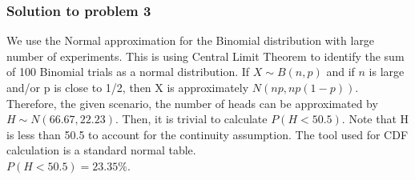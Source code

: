 \documentclass[12pt]{article}%
\begin{document}
\subsubsection{Solution to problem 3}

We use the Normal approximation for the Binomial distribution with large number of experiments. This is using Central Limit Theorem to identify the sum of 100 Binomial trials as a normal distribution. If $X \sim B(n, p)$ and if $n$ is large and/or p is close to 1/2, then X is approximately $N(np, np(1-p))$. Therefore, the given scenario, the number of heads can be approximated by $H \sim N(66.67, 22.23)$. Then, it is trivial to calculate $P(H<50.5)$. Note that H is less than 50.5 to account for the continuity assumption. The tool used for CDF calculation is a standard normal table.\\

\noindent $P(H<50.5) = 23.35\%$.

\end{document}
